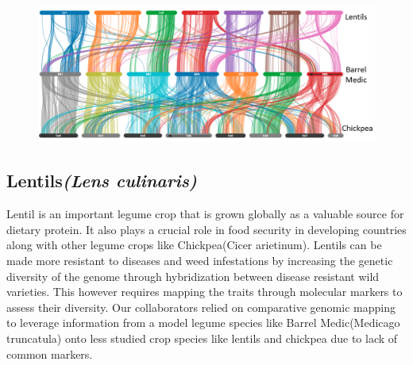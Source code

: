 \begin{figure}
  \centering
  \includegraphics[width=1\linewidth]{images/ch_6_lentils.png}
  \label{fig:ch_6_lentils}
\end{figure}


\subsection{Lentils\textit{(Lens culinaris)}}
Lentil is an important legume crop that is grown globally as a valuable source for dietary protein. It also plays a crucial role in food security in developing countries along with other legume crops like Chickpea(Cicer arietinum)\cite{varshney2013draft}. Lentils can be made more resistant to diseases and weed infestations by increasing the genetic diversity of the genome through hybridization between disease resistant wild varieties. This however requires mapping the traits through molecular markers to assess their diversity. Our collaborators relied on comparative genomic mapping to leverage information from a model legume species like Barrel Medic(Medicago truncatula) onto less studied crop species like lentils and chickpea due to lack of common markers.


